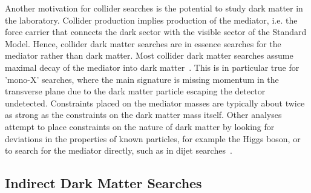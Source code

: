 Another motivation for collider searches is the potential to study dark matter in the laboratory. Collider production implies production of the mediator, i.e. the force carrier that connects the dark sector with the visible sector of the Standard Model. Hence, collider dark matter searches are in essence searches for the mediator rather than dark matter. Most collider dark matter searches assume maximal decay of the mediator into dark matter~\cite{Goodman:2010ku, Fox:2011pm}. This is in particular true for 'mono-X' searches, where the main signature is missing momentum in the transverse plane due to the dark matter particle escaping the detector undetected. Constraints placed on the mediator masses are typically about twice as strong as the constraints on the dark matter mass itself. Other analyses attempt to place constraints on the nature of dark matter by looking for deviations in the properties of known particles, for example the Higgs boson, or to search for the mediator directly, such as in dijet searches~\cite{Penning:2017tmb}.

\subsection{Indirect Dark Matter Searches}

